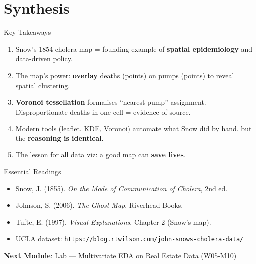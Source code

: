 \documentclass[10pt]{beamer}
\begin{document}
\section{Synthesis}
\begin{frame}{Key Takeaways}
\begin{enumerate}
\item Snow's 1854 cholera map = founding example of \textbf{spatial epidemiology} and data-driven policy.
\item The map's power: \textbf{overlay} deaths (points) on pumps (points) to reveal spatial clustering.
\item \textbf{Voronoi tessellation} formalises ``nearest pump'' assignment. Disproportionate deaths in one cell = evidence of source.
\item Modern tools (leaflet, KDE, Voronoi) automate what Snow did by hand, but the \textbf{reasoning is identical}.
\item The lesson for all data viz: a good map can \textbf{save lives}.
\end{enumerate}
\end{frame}
\begin{frame}{Essential Readings}
\begin{itemize}
\item Snow, J. (1855). \emph{On the Mode of Communication of Cholera}, 2nd ed.
\item Johnson, S. (2006). \emph{The Ghost Map}. Riverhead Books.
\item Tufte, E. (1997). \emph{Visual Explanations}, Chapter 2 (Snow's map).
\item UCLA dataset: \texttt{https://blog.rtwilson.com/john-snows-cholera-data/}
\end{itemize}
\vspace{6pt}
\textbf{Next Module}: Lab --- Multivariate EDA on Real Estate Data (W05-M10)
\end{frame}
\end{document}
